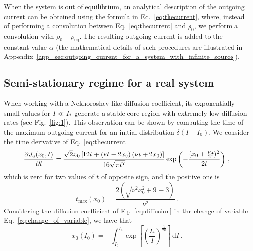 When the system is out of equilibrium, an analytical description of the outgoing current can be obtained using the formula in Eq.~\eqref{eq:thecurrent}, where, instead of performing a convolution between Eq.~\eqref{eq:thecurrent} and $\rho_0$, we perform a convolution with $\rho_0 - \rho_\text{eq}$. The resulting outgoing current is added to the constant value $\alpha$ (the mathematical details of such procedures are illustrated in Appendix~\ref{app_sec:outgoing_current_for_a_system_with_infinite_source}).


\subsection{Semi-stationary regime for a real system}
\label{subsec:semi_stationary_regime_for_a_real_system}


When working with a Nekhoroshev-like diffusion coefficient, its exponentially small values for $I \ll I_\ast$ generate a stable-core region with extremely low diffusion rates (see Fig.~\ref{fig:1}). This observation can be shown by computing the time of the maximum outgoing current for an initial distribution $\delta(I - I_0)$. We consider the time derivative of Eq.~\eqref{eq:thecurrent}
\begin{equation}
\pdv{J_\mathrm{a}(x_0, t)}{t} = \frac{\sqrt{2} x_0 \left[12 t + \left(\nu t - 2 x_0\right) \left(\nu t + 2 x_0\right)\right] }{16 \sqrt{\pi t^7}}\exp\left(-\frac{(x_0+\frac{\nu}{2}t)^2}{2t}\right)\,,
\end{equation}
which is zero for two values of $t$ of opposite sign, and the positive one is
\begin{equation}
    t_{\text{max}}(x_0) = \frac{2 \left(\sqrt{\nu^{2} x_0^{2} + 9} - 3\right)}{\nu^{2}}\,.
    \label{eq:taumax}
\end{equation}
Considering the diffusion coefficient of Eq.~\eqref{eq:diffusion} in the change of variable Eq.~\eqref{eq:change_of_variable}, we have that
\begin{equation}
    x_0(I_0) = {-}\int_{I_0}^{I_\mathrm{a}} \exp\left[\left(\frac{I_\ast}{I}\right)^{\frac{1}{2\kappa}}\right]\,\mathrm{d}I\,.
    \label{eq:peak_current_time}
\end{equation}

